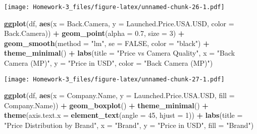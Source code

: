 \documentclass[
]{article}
\newenvironment{Shaded}{\begin{snugshade}}{\end{snugshade}}
\newcommand{\AttributeTok}[1]{\textcolor[rgb]{0.13,0.29,0.53}{#1}}
\newcommand{\ConstantTok}[1]{\textcolor[rgb]{0.56,0.35,0.01}{#1}}
\newcommand{\DecValTok}[1]{\textcolor[rgb]{0.00,0.00,0.81}{#1}}
\newcommand{\FloatTok}[1]{\textcolor[rgb]{0.00,0.00,0.81}{#1}}
\newcommand{\FunctionTok}[1]{\textcolor[rgb]{0.13,0.29,0.53}{\textbf{#1}}}
\newcommand{\NormalTok}[1]{#1}
\newcommand{\SpecialCharTok}[1]{\textcolor[rgb]{0.81,0.36,0.00}{\textbf{#1}}}
\newcommand{\StringTok}[1]{\textcolor[rgb]{0.31,0.60,0.02}{#1}}
\begin{document}
\texttt{[image: Homework-3\_files/figure-latex/unnamed-chunk-26-1.pdf]}

\begin{Shaded}
\begin{Highlighting}[]
\FunctionTok{ggplot}\NormalTok{(df, }\FunctionTok{aes}\NormalTok{(}\AttributeTok{x =}\NormalTok{ Back.Camera, }\AttributeTok{y =}\NormalTok{ Launched.Price.USA.USD, }\AttributeTok{color =}\NormalTok{ Back.Camera)) }\SpecialCharTok{+}
  \FunctionTok{geom\_point}\NormalTok{(}\AttributeTok{alpha =} \FloatTok{0.7}\NormalTok{, }\AttributeTok{size =} \DecValTok{3}\NormalTok{) }\SpecialCharTok{+}
  \FunctionTok{geom\_smooth}\NormalTok{(}\AttributeTok{method =} \StringTok{"lm"}\NormalTok{, }\AttributeTok{se =} \ConstantTok{FALSE}\NormalTok{, }\AttributeTok{color =} \StringTok{"black"}\NormalTok{) }\SpecialCharTok{+}
  \FunctionTok{theme\_minimal}\NormalTok{() }\SpecialCharTok{+}
  \FunctionTok{labs}\NormalTok{(}\AttributeTok{title =} \StringTok{"Price vs Camera Quality"}\NormalTok{,}
       \AttributeTok{x =} \StringTok{"Back Camera (MP)"}\NormalTok{,}
       \AttributeTok{y =} \StringTok{"Price in USD"}\NormalTok{,}
       \AttributeTok{color =} \StringTok{"Back Camera (MP)"}\NormalTok{)}
\end{Highlighting}
\end{Shaded}

\texttt{[image: Homework-3\_files/figure-latex/unnamed-chunk-27-1.pdf]}

\begin{Shaded}
\begin{Highlighting}[]
\FunctionTok{ggplot}\NormalTok{(df, }\FunctionTok{aes}\NormalTok{(}\AttributeTok{x =}\NormalTok{ Company.Name, }\AttributeTok{y =}\NormalTok{ Launched.Price.USA.USD, }\AttributeTok{fill =}\NormalTok{ Company.Name)) }\SpecialCharTok{+}
  \FunctionTok{geom\_boxplot}\NormalTok{() }\SpecialCharTok{+}
  \FunctionTok{theme\_minimal}\NormalTok{() }\SpecialCharTok{+}
  \FunctionTok{theme}\NormalTok{(}\AttributeTok{axis.text.x =} \FunctionTok{element\_text}\NormalTok{(}\AttributeTok{angle =} \DecValTok{45}\NormalTok{, }\AttributeTok{hjust =} \DecValTok{1}\NormalTok{)) }\SpecialCharTok{+}
  \FunctionTok{labs}\NormalTok{(}\AttributeTok{title =} \StringTok{"Price Distribution by Brand"}\NormalTok{,}
       \AttributeTok{x =} \StringTok{"Brand"}\NormalTok{,}
       \AttributeTok{y =} \StringTok{"Price in USD"}\NormalTok{,}
       \AttributeTok{fill =} \StringTok{"Brand"}\NormalTok{)}
\end{Highlighting}
\end{Shaded}
\end{document}
